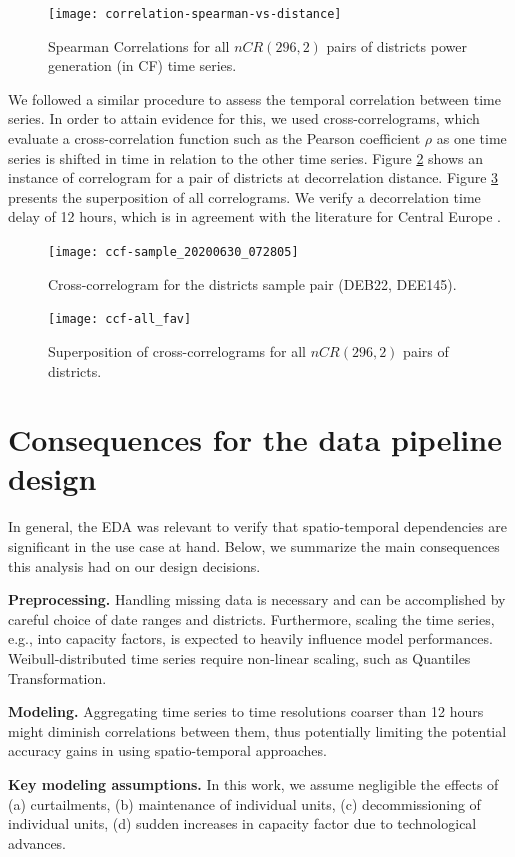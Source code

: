 \begin{figure}[H]%
   \centering
    \caption{Spearman Correlations for all $nCR(296, 2)$ pairs of districts power generation (in CF) time series.}
    \texttt{[image: correlation-spearman-vs-distance]}
   \label{fig:correlogram}
\end{figure}

We followed a similar procedure to assess the temporal correlation between time series.
In order to attain evidence for this, we used cross-correlograms, which evaluate a cross-correlation function such as the Pearson coefficient $\rho$ as one time series is shifted in time in relation to the other time series.
Figure \ref{fig:ccf} shows an instance of correlogram for a pair of districts at decorrelation distance.
Figure \ref{fig:ccf_all} presents the superposition of all correlograms.
We verify a decorrelation time delay of 12 hours, which is in agreement with the literature for Central Europe \cite{engeland2017variability}.

\begin{figure}[H]%
   \centering
    \caption{Cross-correlogram for the districts sample pair (DEB22, DEE145).}
    \texttt{[image: ccf-sample\_20200630\_072805]}
   \label{fig:ccf}
\end{figure}

\begin{figure}[H]%
   \centering
    \caption{Superposition of cross-correlograms for all $nCR(296, 2)$ pairs of districts.}
    \texttt{[image: ccf-all\_fav]}
   \label{fig:ccf_all}
\end{figure}


\section{Consequences for the data pipeline design}\label{sec:eda_conclusions}

In general, the EDA was relevant to verify that spatio-temporal dependencies are significant in the use case at hand.
Below, we summarize the main consequences this analysis had on our design decisions.

\vspace{1em}
\noindent
\textbf{Preprocessing.} Handling missing data is necessary and can be accomplished by careful choice of date ranges and districts. Furthermore, scaling the time series, e.g., into capacity factors, is expected to heavily influence model performances.
Weibull-distributed time series require non-linear scaling, such as Quantiles Transformation.

\vspace{1em}
\noindent
\textbf{Modeling.} Aggregating time series to time resolutions coarser than 12 hours might diminish correlations between them, thus potentially limiting the potential accuracy gains in using spatio-temporal approaches.

\vspace{1em}
\noindent
\textbf{Key modeling assumptions.} In this work, we assume negligible the effects of (a) curtailments, (b) maintenance of individual units, (c) decommissioning of individual units, (d) sudden increases in capacity factor due to technological advances.
